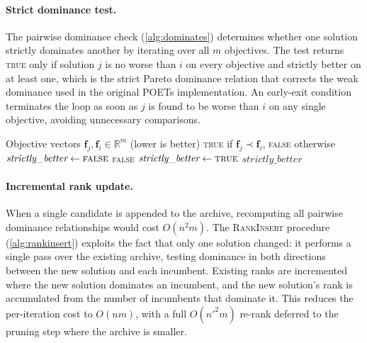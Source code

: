 \documentclass[preprint,review,12pt]{elsarticle}
\begin{document}
\paragraph{Strict dominance test.}
The pairwise dominance check (\cref{alg:dominates}) determines whether one solution strictly dominates another by iterating over all $m$ objectives.
The test returns \textsc{true} only if solution $j$ is no worse than $i$ on every objective and strictly better on at least one, which is the strict Pareto dominance relation that corrects the weak dominance used in the original POETs implementation.
An early-exit condition terminates the loop as soon as $j$ is found to be worse than $i$ on any single objective, avoiding unnecessary comparisons.

\begin{algorithm}[H]
\caption{\textsc{StrictlyDominates}$(\mathbf{f}_j, \mathbf{f}_i, m)$: Does solution $j$ strictly dominate solution $i$?}\label{alg:dominates}
\begin{algorithmic}[1]
\Require Objective vectors $\mathbf{f}_j, \mathbf{f}_i \in \mathbb{R}^m$ (lower is better)
\Ensure \textsc{true} if $\mathbf{f}_j \prec \mathbf{f}_i$, \textsc{false} otherwise
\State $\textit{strictly\_better} \gets \textsc{false}$
    \State \Return \textsc{false}
    \State $\textit{strictly\_better} \gets \textsc{true}$
  \EndIf
\EndFor
\State \Return $\textit{strictly\_better}$
\end{algorithmic}
\end{algorithm}

\paragraph{Incremental rank update.}
When a single candidate is appended to the archive, recomputing all pairwise dominance relationships would cost $O(n^2 m)$.
The \textsc{RankInsert} procedure (\cref{alg:rankinsert}) exploits the fact that only one solution changed: it performs a single pass over the existing archive, testing dominance in both directions between the new solution and each incumbent.
Existing ranks are incremented where the new solution dominates an incumbent, and the new solution's rank is accumulated from the number of incumbents that dominate it.
This reduces the per-iteration cost to $O(nm)$, with a full $O(n'^2 m)$ re-rank deferred to the pruning step where the archive is smaller.
\end{document}
